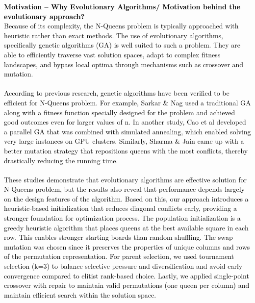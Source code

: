 \documentclass{scrartcl}
\begin{document}
\textcolor{black}{\textbf{Motivation – Why Evolutionary Algorithms/ Motivation behind the evolutionary approach?\\} Because of its complexity, the N-Queens problem is typically approached with heuristic rather than exact methods. The use of evolutionary algorithms, specifically genetic algorithms (GA) is well suited to such a problem. They are able to efficiently traverse vast solution spaces, adapt to complex fitness landscapes, and bypass local optima through mechanisms such as crossover and mutation. \\ \\ According to previous research, genetic algorithms have been verified to be efficient for N-Queens problem. For example, Sarkar \& Nag \cite{sarkar2018nqueens} used a traditional GA along with a fitness function specially designed for the problem and achieved good outcomes even for larger values of n. In another study, Cao et al \cite{cao2020parallel} developed a parallel GA that was combined with simulated annealing, which enabled solving very large instances on GPU clusters. Similarly, Sharma \& Jain \cite{sharma2021novelMutation} came up with a better mutation strategy that repositions queens with the most conflicts, thereby drastically reducing the running time. \\ \\ These studies demonstrate that evolutionary algorithms are effective solution for N-Queens problem, but the results also reveal that performance depends largely on the design features of the algorithm. Based on this, our approach introduces a heuristic-based initialization that reduces diagonal conflicts early, providing a stronger foundation for optimization process. The population initialization is a greedy heuristic algorithm that places queens at the best available square in each row. This enables stronger starting boards than random shuffling. The swap mutation was chosen since it preserves the properties of unique columns and rows of the permutation representation. For parent selection, we used tournament selection (k=3) to balance selective pressure and diversification and avoid early convergence compared to elitist rank-based choice. Lastly, we applied single-point crossover with repair to maintain valid permutations (one queen per column) and maintain efficient search within the solution space. }
\end{document}
